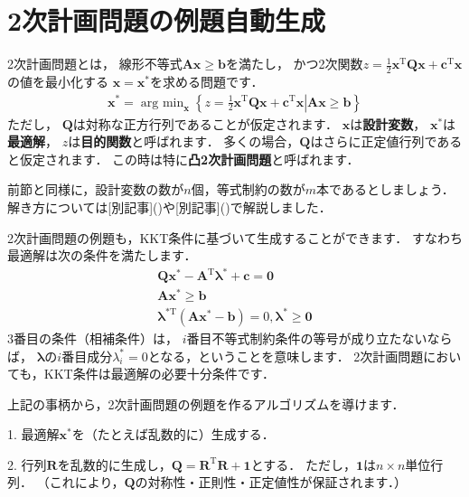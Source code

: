 ﻿\documentclass[a4paper]{jsarticle}
\begin{document}
\section{2次計画問題の例題自動生成}

2次計画問題とは，
線形不等式$\boldsymbol{A}\boldsymbol{x}\geq\boldsymbol{b}$を満たし，
かつ2次関数$z=\frac{1}{2}\boldsymbol{x}^{\mathrm{T}}\boldsymbol{Q}\boldsymbol{x}+\boldsymbol{c}^{\mathrm{T}}\boldsymbol{x}$の値を最小化する
$\boldsymbol{x}=\boldsymbol{x}^{*}$を求める問題です．
\begin{align*}
\boldsymbol{x}^{*}=\mathop{\mathrm{arg~min}}_{\boldsymbol{x}}\left\{
\left.
z=\frac{1}{2}\boldsymbol{x}^{\mathrm{T}}\boldsymbol{Q}\boldsymbol{x}+\boldsymbol{c}^{\mathrm{T}}\boldsymbol{x}
\right|
\boldsymbol{A}\boldsymbol{x}\geq\boldsymbol{b}
\right\}
\end{align*}
ただし，
$\boldsymbol{Q}$は対称な正方行列であることが仮定されます．
$\boldsymbol{x}$は{\bf 設計変数}，
$\boldsymbol{x}^{*}$は{\bf 最適解}，
$z$は{\bf 目的関数}と呼ばれます．
多くの場合，$\boldsymbol{Q}$はさらに正定値行列であると仮定されます．
この時は特に{\bf 凸2次計画問題}と呼ばれます．

前節と同様に，設計変数の数が$n$個，等式制約の数が$m$本であるとしましょう．
解き方については[別記事]()や[別記事]()で解説しました．

2次計画問題の例題も，KKT条件に基づいて生成することができます．
すなわち最適解は次の条件を満たします．
\begin{align*}
\boldsymbol{Q}\boldsymbol{x}^{*}-\boldsymbol{A}^{\mathrm{T}}\boldsymbol{\lambda}^{*}+\boldsymbol{c}=\boldsymbol{0}
\\
\boldsymbol{A}\boldsymbol{x}^{*}\geq\boldsymbol{b}
\\
\boldsymbol{\lambda}^{*\mathrm{T}}(\boldsymbol{A}\boldsymbol{x}^{*}-\boldsymbol{b})=0, \boldsymbol{\lambda}^{*}\geq\boldsymbol{0}
\end{align*}
3番目の条件（相補条件）は，
$i$番目不等式制約条件の等号が成り立たないならば，
$\boldsymbol{\lambda}$の$i$番目成分$\lambda_{i}^{*}=0$となる，ということを意味します．
2次計画問題においても，KKT条件は最適解の必要十分条件です．

上記の事柄から，2次計画問題の例題を作るアルゴリズムを導けます．

1. 最適解$\boldsymbol{x}^{*}$を（たとえば乱数的に）生成する．

2. 行列$\boldsymbol{R}$を乱数的に生成し，$\boldsymbol{Q}=\boldsymbol{R}^{\mathrm{T}}\boldsymbol{R}+\boldsymbol{1}$とする．
ただし，$\boldsymbol{1}$は$n\times n$単位行列．
（これにより，$\boldsymbol{Q}$の対称性・正則性・正定値性が保証されます．）
\end{document}
